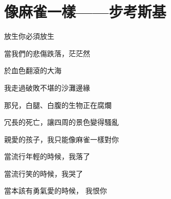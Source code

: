 \section{像麻雀一樣——步考斯基}
放生你必須放生

當我們的悲傷跌落，茫茫然

於血色翻滾的大海

我走過破敗不堪的沙灘邊緣

那兒，白腿、白腹的生物正在腐爛

冗長的死亡，讓四周的景色變得騷亂

親愛的孩子，我只能像麻雀一樣對你

當流行年輕的時候，我落了

當流行笑的時候，我哭了

當本該有勇氣愛的時候， 我恨你
